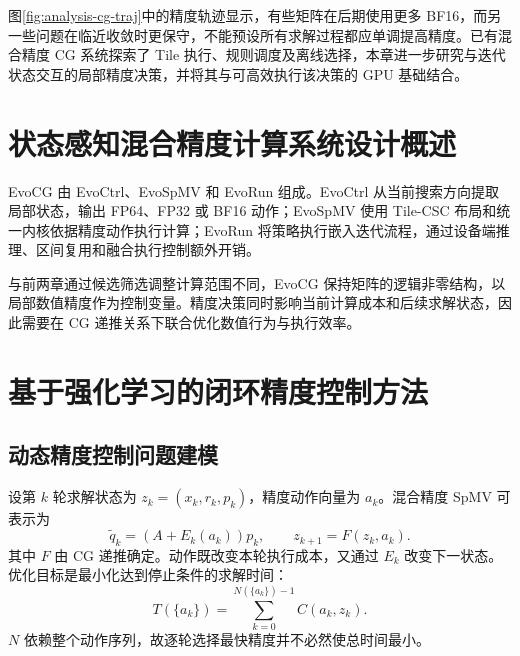 图\ref{fig:analysis-cg-traj}中的精度轨迹显示，有些矩阵在后期使用更多 BF16，而另一些问题在临近收敛时更保守，不能预设所有求解过程都应单调提高精度。已有混合精度 CG 系统探索了 Tile 执行、规则调度及离线选择\cite{yang2024mille,song2023callipepla,chen2025rl}，本章进一步研究与迭代状态交互的局部精度决策，并将其与可高效执行该决策的 GPU 基础结合。

\section{状态感知混合精度计算系统设计概述}
EvoCG 由 EvoCtrl、EvoSpMV 和 EvoRun 组成\cite{evocg2027}。EvoCtrl 从当前搜索方向提取局部状态，输出 FP64、FP32 或 BF16 动作；EvoSpMV 使用 Tile-CSC 布局和统一内核依据精度动作执行计算；EvoRun 将策略执行嵌入迭代流程，通过设备端推理、区间复用和融合执行控制额外开销。


与前两章通过候选筛选调整计算范围不同，EvoCG 保持矩阵的逻辑非零结构，以局部数值精度作为控制变量。精度决策同时影响当前计算成本和后续求解状态，因此需要在 CG 递推关系下联合优化数值行为与执行效率。

\section{基于强化学习的闭环精度控制方法}
\subsection{动态精度控制问题建模}
设第 $k$ 轮求解状态为 $z_k=(x_k,r_k,p_k)$，精度动作向量为 $a_k$。混合精度 SpMV 可表示为
\begin{equation}
 \widetilde q_k=(A+E_k(a_k))p_k,\qquad z_{k+1}=F(z_k,a_k).
 \label{eq:controlled-cg}
\end{equation}
其中 $F$ 由 CG 递推确定。动作既改变本轮执行成本，又通过 $E_k$ 改变下一状态。优化目标是最小化达到停止条件的求解时间：
\begin{equation}
 T(\{a_k\})=\sum_{k=0}^{N(\{a_k\})-1}C(a_k,z_k).
 \label{eq:control-objective}
\end{equation}
$N$ 依赖整个动作序列，故逐轮选择最快精度并不必然使总时间最小。

